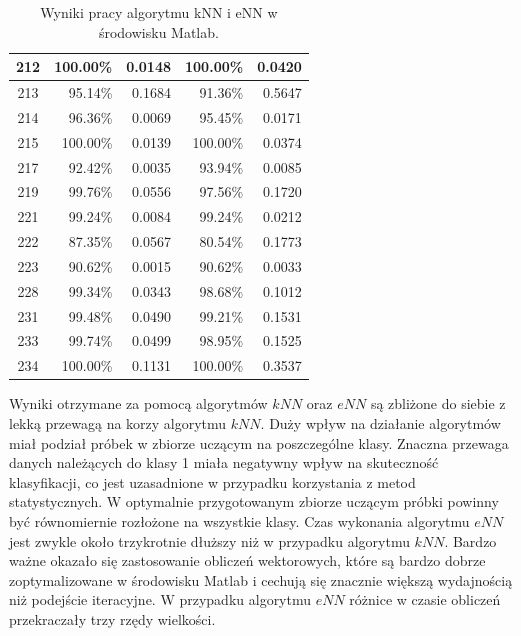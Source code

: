 \begin{table}[H]
\begin{tabular}{|c|r|r|r|r|}
\hline
212 & 100.00\% & 0.0148 & 100.00\% & 0.0420 \\ 
\hline
213 & 95.14\% & 0.1684 & 91.36\% & 0.5647 \\ 
\hline
214 & 96.36\% & 0.0069 & 95.45\% & 0.0171 \\ 
\hline
215 & 100.00\% & 0.0139 & 100.00\% & 0.0374 \\ 
\hline
217 & 92.42\% & 0.0035 & 93.94\% & 0.0085 \\ 
\hline
219 & 99.76\% & 0.0556 & 97.56\% & 0.1720 \\ 
\hline
221 & 99.24\% & 0.0084 & 99.24\% & 0.0212 \\ 
\hline
222 & 87.35\% & 0.0567 & 80.54\% & 0.1773 \\ 
\hline
223 & 90.62\% & 0.0015 & 90.62\% & 0.0033 \\ 
\hline
228 & 99.34\% & 0.0343 & 98.68\% & 0.1012 \\ 
\hline
231 & 99.48\% & 0.0490 & 99.21\% & 0.1531 \\ 
\hline
233 & 99.74\% & 0.0499 & 98.95\% & 0.1525 \\ 
\hline
234 & 100.00\% & 0.1131 & 100.00\% & 0.3537 \\ 
\hline

		
	\end{tabular}
	\caption{Wyniki pracy algorytmu kNN i eNN w środowisku Matlab.}
	\label{tab:matlab-skutecznosc}
	
\end{table}

Wyniki otrzymane za pomocą algorytmów $kNN$ oraz $eNN$ są zbliżone do siebie z lekką przewagą na korzy algorytmu $kNN$. Duży wpływ na działanie algorytmów miał podział próbek w zbiorze uczącym na poszczególne klasy. Znaczna przewaga danych należących do klasy 1 miała negatywny wpływ na skuteczność klasyfikacji, co jest uzasadnione w przypadku korzystania z metod statystycznych. W optymalnie przygotowanym zbiorze uczącym próbki powinny być równomiernie rozłożone na wszystkie klasy. Czas wykonania algorytmu $eNN$ jest zwykle około trzykrotnie dłuższy niż w przypadku algorytmu $kNN$. Bardzo ważne okazało się zastosowanie obliczeń wektorowych, które są bardzo dobrze zoptymalizowane w środowisku Matlab i cechują się znacznie większą wydajnością niż podejście iteracyjne. W przypadku algorytmu $eNN$ różnice w czasie obliczeń przekraczały trzy rzędy wielkości.